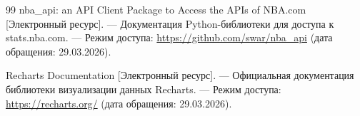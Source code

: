 \begin{thebibliography}{99}
	nba\_api: an API Client Package to Access the APIs of NBA.com [Электронный
	ресурс]. --- Документация Python-библиотеки для доступа к stats.nba.com. ---
	Режим доступа: \url{https://github.com/swar/nba_api}
	(дата обращения: 29.03.2026).

	Recharts Documentation [Электронный ресурс]. --- Официальная документация
	библиотеки визуализации данных Recharts. --- Режим доступа:
	\url{https://recharts.org/}
	(дата обращения: 29.03.2026).

\end{thebibliography}
\endgroup
